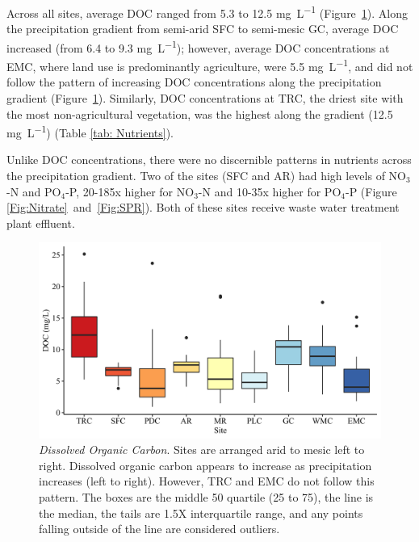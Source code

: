Across all sites, average DOC ranged from 5.3 to 12.5 \unit{\mg\per\L} (Figure~\ref{Fig:DOC}). Along the precipitation gradient from semi-arid SFC to semi-mesic GC, average DOC increased (from 6.4 to 9.3 \unit{\mg\per\L}); however, average DOC concentrations at EMC, where land use is predominantly agriculture, were 5.5 \unit{\mg\per\L}, and did not follow the pattern of increasing DOC concentrations along the precipitation gradient (Figure~\ref{Fig:DOC}). Similarly, DOC concentrations at TRC, the driest site with the most non-agricultural vegetation, was the highest along the gradient (12.5 \unit{\mg\per\L}) (Table \ref{tab: Nutrients}).

Unlike DOC concentrations, there were no discernible patterns in nutrients across the precipitation gradient. Two of the sites (SFC and AR) had high levels of NO$_3$-N and PO$_4$-P, 20-185x higher for NO$_3$-N and 10-35x higher for PO$_4$-P (Figure \ref{Fig:Nitrate}~and~\ref{Fig:SPR}). Both of these sites receive waste water treatment plant effluent.

\begin{figure}[htb]
\begin{center}
\includegraphics[scale=0.2]{Figs/DOC.png}
\caption[Dissolved Organic Carbon]{\textit{Dissolved Organic Carbon}. Sites are arranged arid to mesic left to right. Dissolved organic carbon appears to increase as precipitation increases (left to right). However, TRC and EMC do not follow this pattern. The boxes are the middle 50 quartile (25 to 75), the line is the median, the tails are 1.5X interquartile range, and any points falling outside of the line are considered outliers.
}\label{Fig:DOC}
\end{center}
\end{figure}

